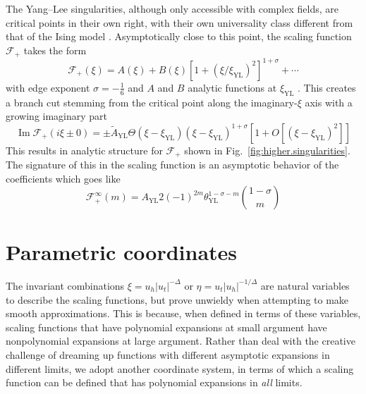 \documentclass[
aps,
pre,
preprint,
longbibliography,
floatfix
]{revtex4-2}
\begin{document}
The Yang--Lee singularities, although only accessible with complex fields, are
critical points in their own right, with their own universality class different
from that of the Ising model \cite{Fisher_1978_Yang-Lee}. Asymptotically close
to this point, the scaling function $\mathcal F_+$ takes the form
\begin{equation} \label{eq:yang.lee.sing}
  \mathcal F_+(\xi)
  =A(\xi) +B(\xi)[1+(\xi/\xi_{\mathrm{YL}})^2]^{1+\sigma}+\cdots
\end{equation}
with edge exponent $\sigma=-\frac16$ and $A$ and $B$ analytic functions at
$\xi_\mathrm{YL}$ \cite{Cardy_1985_Conformal, Fonseca_2003_Ising}. This creates
a branch cut stemming from the critical point along the imaginary-$\xi$ axis
with a growing imaginary part
\begin{equation}
  \operatorname{Im}\mathcal F_+(i\xi\pm0)=\pm\tilde A_\mathrm{YL}\Theta(\xi-\xi_\mathrm{YL})(\xi-\xi_\mathrm{YL})^{1+\sigma}[1+O[(\xi-\xi_\mathrm{YL})^2]]
\end{equation}
This results in analytic structure for $\mathcal F_+$ shown in
Fig.~\ref{fig:higher.singularities}. The signature of this in the scaling
function is an asymptotic behavior of the coefficients which goes like
\begin{equation} \label{eq:high.asymptotic}
  \mathcal F_+^\infty(m)=A_\mathrm{YL}2(-1)^{2m}\theta_\mathrm{YL}^{1-\sigma-m}\binom{1-\sigma}{m}
\end{equation}


\section{Parametric coordinates}

The invariant combinations $\xi=u_h|u_t|^{-\Delta}$ or
$\eta=u_t|u_h|^{-1/\Delta}$ are natural variables to describe the scaling
functions, but prove unwieldy when attempting to make smooth approximations.
This is because, when defined in terms of these variables, scaling functions
that have polynomial expansions at small argument have nonpolynomial expansions
at large argument. Rather than deal with the creative challenge of dreaming up
functions with different asymptotic expansions in different limits, we adopt
another coordinate system, in terms of which a scaling function can be defined
that has polynomial expansions in \emph{all} limits.
\end{document}
